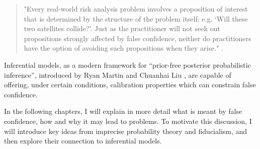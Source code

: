 \documentclass[
]{report}
\theoremstyle{definition}
\begin{document}
\begin{quote}
"Every real-world risk analysis problem involves a proposition of interest that is determined by
the structure of the problem itself; e.g. ‘Will these two satellites collide?’. Just as the practitioner will not seek out propositions strongly affected by false confidence, neither do practitioners have the option of avoiding such propositions when they arise." \cite{balch_satellite_2019}.
\end{quote}

Inferential models, as a modern framework for ``prior-free posterior
probabilistic inference'', introduced by Ryan Martin and Chuanhai Liu
\cite{martin_inferential_2013}, are capable of offering, under certain
conditions, calibration properties which can constrain false confidence.

In the following chapters, I will explain in more detail what is meant
by false confidence, how and why it may lead to problems. To motivate
this discussion, I will introduce key ideas from imprecise probability
theory and fiducialism, and then explore their connection to inferential
models.
\end{document}
